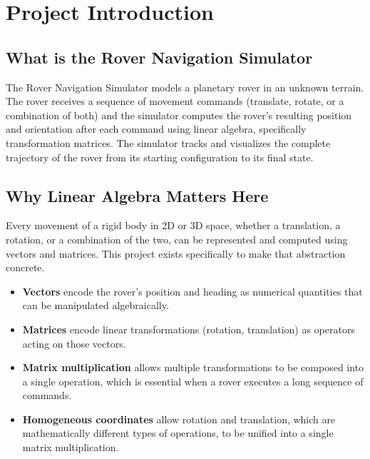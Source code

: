 \documentclass[12pt]{report}
\begin{document}
\chapter{Project Introduction}

\section{What is the Rover Navigation Simulator}
The Rover Navigation Simulator models a planetary rover in an unknown terrain. The rover receives a sequence of movement commands (translate, rotate, or a combination of both) and the simulator computes the rover's resulting position and orientation after each command using linear algebra, specifically transformation matrices. The simulator tracks and visualizes the complete trajectory of the rover from its starting configuration to its final state.

\section{Why Linear Algebra Matters Here}
\begin{infobox}[title=Core Idea]
Every movement of a rigid body in 2D or 3D space, whether a translation, a rotation, or a combination of the two, can be represented and computed using vectors and matrices. This project exists specifically to make that abstraction concrete.
\end{infobox}

\begin{itemize}
\item \textbf{Vectors} encode the rover's position and heading as numerical quantities that can be manipulated algebraically.
\item \textbf{Matrices} encode linear transformations (rotation, translation) as operators acting on those vectors.
\item \textbf{Matrix multiplication} allows multiple transformations to be composed into a single operation, which is essential when a rover executes a long sequence of commands.
\item \textbf{Homogeneous coordinates} allow rotation and translation, which are mathematically different types of operations, to be unified into a single matrix multiplication.
\end{itemize}
\end{document}
